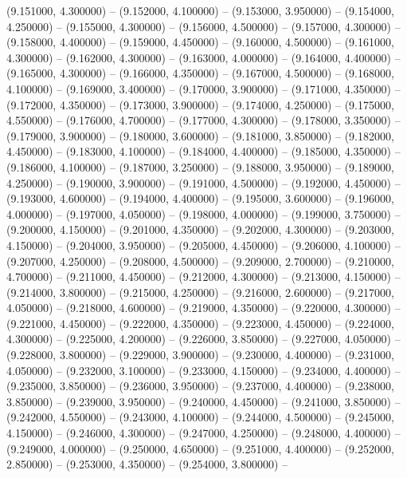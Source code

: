 (9.151000, 4.300000) -- 
(9.152000, 4.100000) -- 
(9.153000, 3.950000) -- 
(9.154000, 4.250000) -- 
(9.155000, 4.300000) -- 
(9.156000, 4.500000) -- 
(9.157000, 4.300000) -- 
(9.158000, 4.400000) -- 
(9.159000, 4.450000) -- 
(9.160000, 4.500000) -- 
(9.161000, 4.300000) -- 
(9.162000, 4.300000) -- 
(9.163000, 4.000000) -- 
(9.164000, 4.400000) -- 
(9.165000, 4.300000) -- 
(9.166000, 4.350000) -- 
(9.167000, 4.500000) -- 
(9.168000, 4.100000) -- 
(9.169000, 3.400000) -- 
(9.170000, 3.900000) -- 
(9.171000, 4.350000) -- 
(9.172000, 4.350000) -- 
(9.173000, 3.900000) -- 
(9.174000, 4.250000) -- 
(9.175000, 4.550000) -- 
(9.176000, 4.700000) -- 
(9.177000, 4.300000) -- 
(9.178000, 3.350000) -- 
(9.179000, 3.900000) -- 
(9.180000, 3.600000) -- 
(9.181000, 3.850000) -- 
(9.182000, 4.450000) -- 
(9.183000, 4.100000) -- 
(9.184000, 4.400000) -- 
(9.185000, 4.350000) -- 
(9.186000, 4.100000) -- 
(9.187000, 3.250000) -- 
(9.188000, 3.950000) -- 
(9.189000, 4.250000) -- 
(9.190000, 3.900000) -- 
(9.191000, 4.500000) -- 
(9.192000, 4.450000) -- 
(9.193000, 4.600000) -- 
(9.194000, 4.400000) -- 
(9.195000, 3.600000) -- 
(9.196000, 4.000000) -- 
(9.197000, 4.050000) -- 
(9.198000, 4.000000) -- 
(9.199000, 3.750000) -- 
(9.200000, 4.150000) -- 
(9.201000, 4.350000) -- 
(9.202000, 4.300000) -- 
(9.203000, 4.150000) -- 
(9.204000, 3.950000) -- 
(9.205000, 4.450000) -- 
(9.206000, 4.100000) -- 
(9.207000, 4.250000) -- 
(9.208000, 4.500000) -- 
(9.209000, 2.700000) -- 
(9.210000, 4.700000) -- 
(9.211000, 4.450000) -- 
(9.212000, 4.300000) -- 
(9.213000, 4.150000) -- 
(9.214000, 3.800000) -- 
(9.215000, 4.250000) -- 
(9.216000, 2.600000) -- 
(9.217000, 4.050000) -- 
(9.218000, 4.600000) -- 
(9.219000, 4.350000) -- 
(9.220000, 4.300000) -- 
(9.221000, 4.450000) -- 
(9.222000, 4.350000) -- 
(9.223000, 4.450000) -- 
(9.224000, 4.300000) -- 
(9.225000, 4.200000) -- 
(9.226000, 3.850000) -- 
(9.227000, 4.050000) -- 
(9.228000, 3.800000) -- 
(9.229000, 3.900000) -- 
(9.230000, 4.400000) -- 
(9.231000, 4.050000) -- 
(9.232000, 3.100000) -- 
(9.233000, 4.150000) -- 
(9.234000, 4.400000) -- 
(9.235000, 3.850000) -- 
(9.236000, 3.950000) -- 
(9.237000, 4.400000) -- 
(9.238000, 3.850000) -- 
(9.239000, 3.950000) -- 
(9.240000, 4.450000) -- 
(9.241000, 3.850000) -- 
(9.242000, 4.550000) -- 
(9.243000, 4.100000) -- 
(9.244000, 4.500000) -- 
(9.245000, 4.150000) -- 
(9.246000, 4.300000) -- 
(9.247000, 4.250000) -- 
(9.248000, 4.400000) -- 
(9.249000, 4.000000) -- 
(9.250000, 4.650000) -- 
(9.251000, 4.400000) -- 
(9.252000, 2.850000) -- 
(9.253000, 4.350000) -- 
(9.254000, 3.800000) -- 
